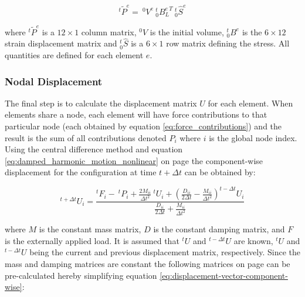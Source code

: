 \begin{equation}
\label{eq:force_contributions}
^t\tilde{P}^{e} = \ ^0V^{e} \ ^t_0B^{e \ T}_L \ ^t_0\hat{S}^{e}
\end{equation}

where $^t\tilde{P}^{e}$ is a $12 \times 1$ column matrix, $^0V$ is
the initial volume, $^t_0B^{e}$ is the $6 \times 12$ strain
displacement matrix and $^t_0\hat{S}$ is a $6 \times 1$
row matrix defining the stress. All quantities are defined for each
element $e$.

\subsubsection*{Nodal Displacement}
\label{sec:nodal_displacement}
The final step is to calculate the displacement matrix $U$ for each
element. When elements share a node, each element will have force
contributions to that particular 
node (each obtained by equation \ref{eq:force_contributions}) and the result is
the sum of all contributions denoted $P_i$ where $i$ is the global
node index. \\

Using the central difference method and equation
\eqref{eq:damped_harmonic_motion_nonlinear} on page
\pageref{eq:damped_harmonic_motion_nonlinear} the component-wise
displacement for the configuration at time $t + \Delta t$ can be
obtained by: 

\begin{equation}
\label{eq:displacement-vector-component-wise}
^{t+\Delta t}U_i = \frac{^tF_i - \ ^tP_i + \frac{2M_{ii}}{\Delta
    t^2} \ ^tU_i + (\frac{D_{ii}}{2 \Delta t} - \frac{M_{ii}}{\Delta
    t^2})^{t-\Delta t}U_i}{\frac{D_{ii}}{2 \Delta t} +
  \frac{M_{ii}}{\Delta t^2}}
\end{equation}

where $M$ is the constant mass matrix, $D$ is the constant damping
matrix, and $F$ is the externally applied load. It is assumed that
$^tU$ and $^{t-\Delta t}U$ are known, $^tU$ and $^{t-\Delta t}U$ being
the current and previous displacement matrix, respectively.
Since the mass and
damping matrices are constant the following matrices on page
\pageref{eq:vector_component_abc} can be pre-calculated 
hereby simplifying equation \eqref{eq:displacement-vector-component-wise}:

